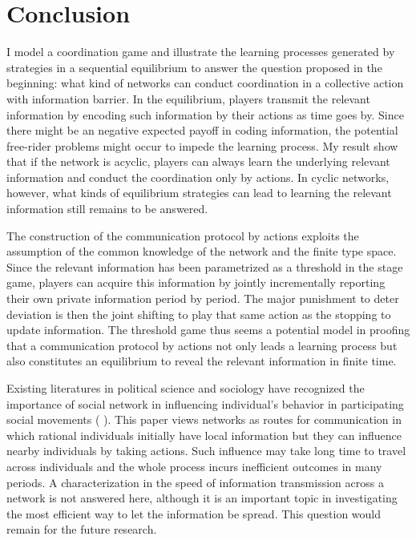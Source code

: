 \documentclass[12pt,letter]{article}
\theoremstyle{definition}
\theoremstyle{definition}
\theoremstyle{remark}
\theoremstyle{claim}
\begin{document}
\section{Conclusion}
\label{sec:con}

I model a coordination game and illustrate the learning processes generated by strategies in a sequential equilibrium to answer the question proposed in the beginning: what kind of networks can conduct coordination in a collective action with information barrier. In the equilibrium, players transmit the relevant information by encoding such information by their actions as time goes by. Since there might be an negative expected payoff in coding information, the potential free-rider problems might occur to impede the learning process. My result show that if the network is acyclic, players can always learn the underlying relevant information and conduct the coordination only by actions. In cyclic networks, however, what kinds of equilibrium strategies can lead to learning the relevant information still remains to be answered.


The construction of the communication protocol by actions exploits the assumption of the common knowledge of the network and the finite type space. Since the relevant information has been parametrized as a threshold in the stage game, players can acquire this information by jointly incrementally reporting their own private information period by period. The major punishment to deter deviation is then the joint shifting to play that same action as the stopping to update information. The threshold game thus seems a potential model in proofing that a communication protocol by actions not only leads a learning process but also constitutes an equilibrium to reveal the relevant information in finite time.

Existing literatures in political science and sociology have recognized the importance of social network in influencing individual's behavior in participating social movements ( \citep{Passy2003}\citep{McAdam2003}\citep{Siegel2009}). This paper views networks as routes for communication in which rational individuals initially have local information but they can influence nearby individuals by taking actions. Such influence may take long time to travel across individuals and the whole process incurs inefficient outcomes in many periods. A characterization in the speed of information transmission across a network is not answered here, although it is an important topic in investigating the most efficient way to let the information be spread. This question would remain for the future research.
\end{document}
